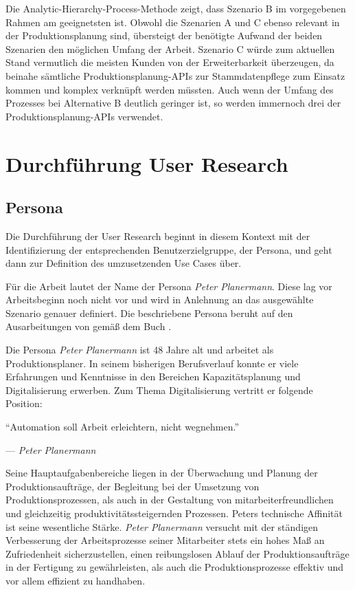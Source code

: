 Die Analytic-Hierarchy-Process-Methode zeigt, dass Szenario B im vorgegebenen Rahmen am geeignetsten ist. Obwohl die Szenarien A und C ebenso relevant in der Produktionsplanung sind, übersteigt der benötigte Aufwand der beiden Szenarien den möglichen Umfang der Arbeit. Szenario C würde zum aktuellen Stand vermutlich die meisten Kunden von der Erweiterbarkeit überzeugen, da beinahe sämtliche Produktionsplanung-\ac{API}s zur Stammdatenpflege zum Einsatz kommen und komplex verknüpft werden müssten. Auch wenn der Umfang des Prozesses bei Alternative B deutlich geringer ist, so werden immernoch drei der Produktionsplanung-\ac{API}s verwendet.
% 
% 
% 
% 
% 
% 
\section{Durchführung User Research}
\subsection{Persona}
Die Durchführung der User Research beginnt in diesem Kontext mit der Identifizierung der entsprechenden Benutzerzielgruppe, der Persona, und geht dann zur Definition des umzusetzenden Use Cases über.

Für die Arbeit lautet der Name der Persona \textit{Peter Planermann}. Diese lag vor Arbeitsbeginn noch nicht vor und wird in Anlehnung an das ausgewählte Szenario genauer definiert. Die beschriebene Persona beruht auf den Ausarbeitungen von \citeauthor{Dickersbach.2014}
gemäß dem Buch .
\autocite{Dickersbach.2014}

Die Persona \textit{Peter Planermann} ist 48 Jahre alt und arbeitet als Produktionsplaner. In seinem bisherigen Berufsverlauf konnte er viele Erfahrungen und Kenntnisse in den Bereichen Kapazitätsplanung und Digitalisierung erwerben. Zum Thema Digitalisierung vertritt er folgende Position: 

\epigraph{
\centering
\enquote{Automation soll Arbeit erleichtern, nicht wegnehmen.}
}{--- \textit{Peter Planermann}}

Seine Hauptaufgabenbereiche liegen in der Überwachung und Planung der Produktionsaufträge, der Begleitung bei der Umsetzung von Produktionsprozessen, als auch in der Gestaltung von mitarbeiterfreundlichen und gleichzeitig produktivitätssteigernden Prozessen. Peters technische Affinität ist seine wesentliche Stärke. \textit{Peter Planermann} versucht mit der ständigen Verbesserung der Arbeitsprozesse seiner Mitarbeiter stets ein hohes Maß an Zufriedenheit sicherzustellen, einen reibungslosen Ablauf der Produktionsaufträge in der Fertigung zu gewährleisten, als auch die Produktionsprozesse effektiv und vor allem effizient zu handhaben.

